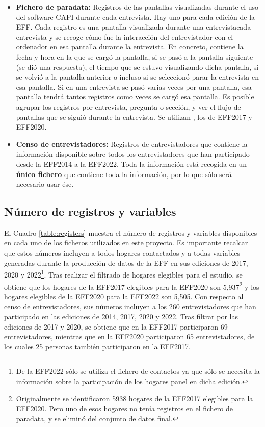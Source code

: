 \begin{itemize}[noitemsep]
    \item \textbf{Fichero de paradata:} Registros de las pantallas visualizadas durante el uso del software CAPI durante cada entrevista. Hay uno para cada edición de la EFF. Cada registro es una pantalla visualizada durante una entrevistacada entrevista y se recoge cómo fue la interacción del entrevistador con el ordenador en esa pantalla durante la entrevista. En concreto, contiene la fecha y hora en la que se cargó la pantalla, si se pasó a la pantalla siguiente (se dió una respuesta), el tiempo que se estuvo visualizando dicha pantalla, si se volvió a la pantalla anterior o incluso si se seleccionó parar la entrevista en esa pantalla. Si en una entrevista se pasó varias veces por una pantalla, esa pantalla tendrá tantos registros como veces se cargó esa pantalla. Es posible agrupar los registros por entrevista, pregunta o sección, y ver el flujo de pantallas que se siguió durante la entrevista. Se utilizan , los de EFF2017 y EFF2020.
    \item \textbf{Censo de entrevistadores:} Registros de entrevistadores que contiene la información disponible sobre todos los entrevistadores que han participado desde la EFF2014 a la EFF2022. Toda la información está recogida en un \textbf{único fichero} que contiene toda la información, por lo que sólo será necesario usar ése.
\end{itemize}

\subsection*{Número de registros y variables}
\label{section:registers_variables}

El Cuadro \ref{table:registers} muestra el número de registros y variables disponibles en cada uno de los ficheros utilizados en este proyecto. Es importante recalcar que estos números incluyen a todos hogares contactados y a todas variables generadas durante la producción de datos de la EFF en sus ediciones de 2017, 2020 y 2022\footnote{De la EFF2022 sólo se utiliza el fichero de contactos ya que sólo se necesita la información sobre la participación de los hogares panel en dicha edición.}. Tras realizar el filtrado de hogares elegibles para el estudio, se obtiene que los hogares de la EFF2017 elegibles para la EFF2020 son 5,937\footnote{Originalmente se identificaron 5938 hogares de la EFF2017 elegibles para la EFF2020. Pero uno de esos hogares no tenía registros en el fichero de paradata, y se eliminó del conjunto de datos final.} y los hogares elegibles de la EFF2020 para la EFF2022 son 5,505. Con respecto al censo de entrevistadores, sus números incluyen a los 260 entrevistadores que han participado en las ediciones de 2014, 2017, 2020 y 2022. Tras filtrar por las ediciones de 2017 y 2020, se obtiene que en la EFF2017 participaron 69 entrevistadores, mientras que en la EFF2020 participaron 65 entrevistadores, de los cuales 25 personas también participaron en la EFF2017.

